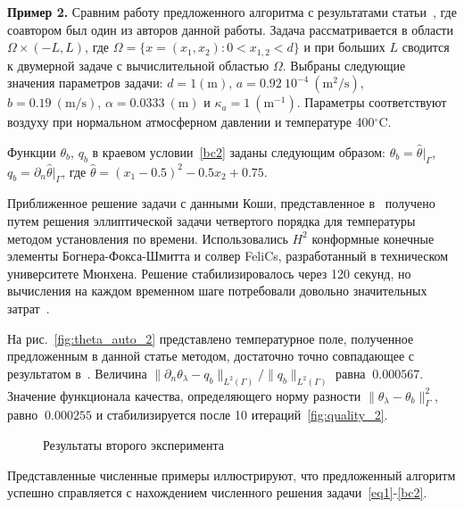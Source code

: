 \textbf{Пример 2.}
Сравним работу предложенного алгоритма с результатами статьи~\cite{CNSNS19},
где соавтором был один из авторов данной работы.
Задача рассматривается в области $\Omega \times (-L,L)$,
где $\Omega = \{ x = (x_1,x_2) \colon 0 < x_{1,2} < d\}$
и при больших $L$ сводится к двумерной задаче с вычислительной областью $\Omega$.
Выбраны следующие значения параметров задачи:
$d = \mathrm{1(m)}$, $a = 0.92~10^{-4}~\mathrm{(m^2/s)}$, $b= 0.19~\mathrm{(m/s)}$,
$\alpha = 0.0333~\mathrm{(m)}$ и $\kappa_a = 1~\mathrm{(m^{-1})}$.
Параметры соответствуют воздуху при нормальном атмосферном давлении и температуре 400$^\circ$C\@.

Функции $\theta_b$, $q_b$ в краевом условии~\eqref{bc2} заданы следующим образом:
$\theta_b = \widehat{\theta}|_{\Gamma}$, $q_b = \partial_n \widehat{\theta}|_{\Gamma}$, где
$\widehat{\theta} = (x_1-0.5)^2 - 0.5x_2+0.75$.

Приближенное решение задачи с данными Коши, представленное в~\cite{CNSNS19}
получено путем решения эллиптической задачи четвертого
порядка для температуры методом установления по времени.
Использовались $H^2$ конформные конечные элементы Богнера-Фокса-Шмитта и
солвер FeliCs, разработанный в техническом университете Мюнхена.
Решение стабилизировалось через 120 секунд, но вычисления на каждом временном
шаге потребовали довольно значительных затрат~\cite{CNSNS19}.

На рис.~\ref{fig:theta_auto_2} представлено температурное поле, полученное
предложенным в данной статье методом, достаточно точно совпадающее с результатом в~\cite{CNSNS19}.
Величина $\|\partial_n\theta_\lambda-q_b\|_{L^2(\Gamma)}/\|q_b\|_{L^2(\Gamma)}$ равна $~0.000567$.
Значение функционала качества, определяющего норму разности $\|\theta_\lambda -\theta_b\|^2_\Gamma$,
равно $~0.000255$ и стабилизируется после 10 итераций~\ref{fig:quality_2}.

\begin{figure}
    \centering
    \caption{Результаты второго эксперимента}
\end{figure}

Представленные численные примеры иллюстрируют, что предложенный алгоритм успешно справляется
с нахождением численного решения задачи~\eqref{eq1}-\eqref{bc2}.


